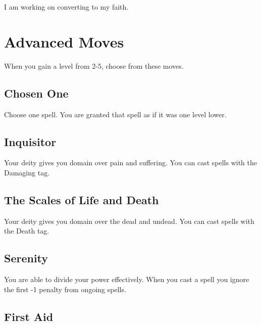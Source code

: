          

I am working on converting \thinrules[n=2] to my faith.

       

       
\section{Advanced Moves}    
       

         
\startInstructionsAfterHeader
When you gain a level from 2-5, choose from these moves.
\stopInstructionsAfterHeader
         
\subsection{Chosen One}   
         

Choose one spell. You are granted that spell as if it was one level lower.

         
\subsection{Inquisitor}   
         

Your deity gives you domain over pain and suffering. You can cast spells with the Damaging tag.

         
\subsection{The Scales of Life and Death}     
         

Your deity gives you domain over the dead and undead. You can cast spells with the Death tag.

         
\subsection{Serenity}   
         

You are able to divide your power effectively. When you cast a spell you ignore the first -1 penalty from ongoing spells.

         
\subsection{First Aid}   
         

